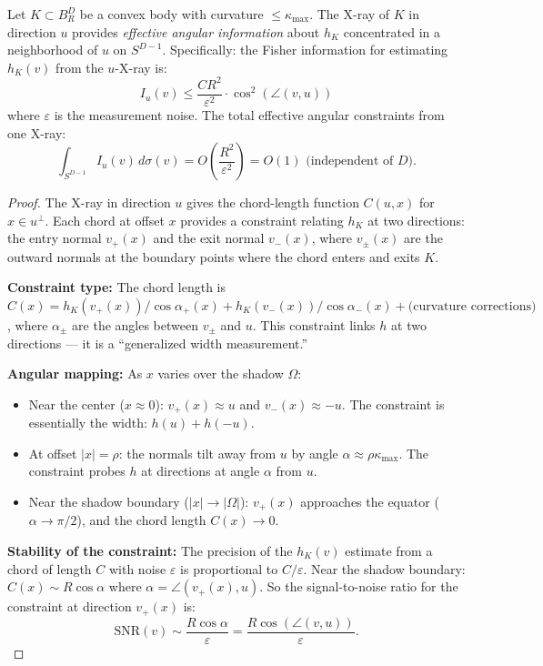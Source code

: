 \begin{theorem}
\label{thm:angular}
Let $K \subset B_R^D$ be a convex body with curvature $\leq \kappa_{\max}$. The X-ray of $K$ in direction $u$ provides \emph{effective angular information} about $h_K$ concentrated in a neighborhood of $u$ on $S^{D-1}$. Specifically: the Fisher information for estimating $h_K(v)$ from the $u$-X-ray is:
\[
  I_u(v) \leq \frac{C R^2}{\varepsilon^2} \cdot \cos^2(\angle(v, u))
\]
where $\varepsilon$ is the measurement noise. The total effective angular constraints from one X-ray:
\[
  \int_{S^{D-1}} I_u(v) \, d\sigma(v) = O\!\left(\frac{R^2}{\varepsilon^2}\right) = O(1) \text{ (independent of } D\text{)}.
\]
\end{theorem}

\begin{proof}
The X-ray in direction $u$ gives the chord-length function $C(u, x)$ for $x \in u^\perp$. Each chord at offset $x$ provides a constraint relating $h_K$ at two directions: the entry normal $v_+(x)$ and the exit normal $v_-(x)$, where $v_\pm(x)$ are the outward normals at the boundary points where the chord enters and exits $K$.

\textbf{Constraint type:} The chord length is $C(x) = h_K(v_+(x))/\cos\alpha_+(x) + h_K(v_-(x))/\cos\alpha_-(x) + \text{(curvature corrections)}$, where $\alpha_\pm$ are the angles between $v_\pm$ and $u$. This constraint links $h$ at two directions --- it is a ``generalized width measurement.''

\textbf{Angular mapping:} As $x$ varies over the shadow $\Omega$:
\begin{itemize}
  \item Near the center ($x \approx 0$): $v_+(x) \approx u$ and $v_-(x) \approx -u$. The constraint is essentially the width: $h(u) + h(-u)$.
  \item At offset $|x| = \rho$: the normals tilt away from $u$ by angle $\alpha \approx \rho \kappa_{\max}$. The constraint probes $h$ at directions at angle $\alpha$ from $u$.
  \item Near the shadow boundary ($|x| \to |\Omega|$): $v_+(x)$ approaches the equator ($\alpha \to \pi/2$), and the chord length $C(x) \to 0$.
\end{itemize}

\textbf{Stability of the constraint:} The precision of the $h_K(v)$ estimate from a chord of length $C$ with noise $\varepsilon$ is proportional to $C/\varepsilon$. Near the shadow boundary: $C(x) \sim R \cos\alpha$ where $\alpha = \angle(v_+(x), u)$. So the signal-to-noise ratio for the constraint at direction $v_+(x)$ is:
\[
  \text{SNR}(v) \sim \frac{R\cos\alpha}{\varepsilon} = \frac{R\cos(\angle(v, u))}{\varepsilon}.
\]


\end{proof}

